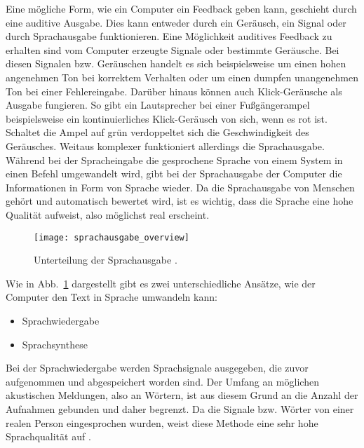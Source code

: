 Eine mögliche Form, wie ein Computer ein Feedback geben kann, geschieht durch eine auditive Ausgabe. Dies kann entweder durch ein Geräusch, ein Signal oder durch Sprachausgabe funktionieren.
\newline \newline
Eine Möglichkeit auditives Feedback zu erhalten sind vom Computer erzeugte Signale oder bestimmte Geräusche. Bei diesen Signalen bzw. Geräuschen handelt es sich beispielsweise um einen hohen angenehmen Ton bei korrektem Verhalten oder um einen dumpfen unangenehmen Ton bei einer Fehlereingabe. Darüber hinaus können auch Klick-Geräusche als Ausgabe fungieren. So gibt ein Lautsprecher bei einer Fußgängerampel beispielsweise ein kontinuierliches Klick-Geräusch von sich, wenn es rot ist. Schaltet die Ampel auf grün verdoppeltet sich die Geschwindigkeit des Geräusches.
\newline \newline
Weitaus komplexer funktioniert allerdings die Sprachausgabe. Während bei der Spracheingabe die gesprochene Sprache von einem System in einen Befehl umgewandelt wird, gibt bei der Sprachausgabe der Computer die Informationen in Form von Sprache wieder. Da die Sprachausgabe von Menschen gehört und automatisch bewertet wird, ist es wichtig, dass die Sprache eine hohe Qualität aufweist, also möglichst real erscheint. 
\begin{figure}
\centering
\texttt{[image: sprachausgabe\_overview]}
\caption{Unterteilung der Sprachausgabe \cite{FellbaumSprache}.}
\label{fig:SprachausgabeOverview}
\end{figure}
\newline \newline
Wie in Abb.~\ref{fig:SprachausgabeOverview} dargestellt gibt es zwei unterschiedliche Ansätze, wie der Computer den Text in Sprache umwandeln kann:
\begin{itemize}
      \item Sprachwiedergabe
      \item Sprachsynthese
\end{itemize}
\vspace{\baselineskip} \vspace{\baselineskip}
Bei der Sprachwiedergabe werden Sprachsignale ausgegeben, die zuvor aufgenommen und abgespeichert worden sind. Der Umfang an möglichen akustischen Meldungen, also an Wörtern, ist aus diesem Grund an die Anzahl der Aufnahmen gebunden und daher begrenzt. Da die Signale bzw. Wörter von einer realen Person eingesprochen wurden, weist diese Methode eine sehr hohe Sprachqualität auf \cite{KaufmannPfisterSprache}.
